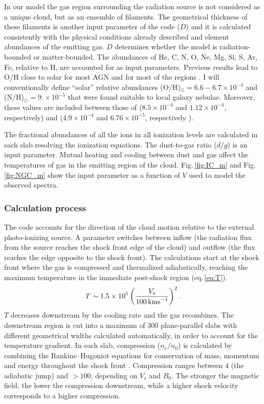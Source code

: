 \documentclass[../main.tex]{subfiles}
\begin{document}
In our model the gas region surrounding the radiation source is not considered as a unique cloud, but as an ensemble of filaments. 
The geometrical thickness of these filaments is another input parameter of the code ($D$) and it is calculated consistently with the physical conditions already described and element abundances of the emitting gas.
$D$ determines whether the model is radiation-bounded or matter-bounded.
The abundances of He, C, N, O, Ne, Mg, Si, S, Ar, Fe, relative to H, are accounted for as input parameters. 
Previous results lead to O/H close to solar for most AGN and for most of the  regions \citep[e.g.][]{Contini17}.
I will conventionally define ``solar'' relative abundances (O/H)$_{\odot }=6.6 - 6.7 \times10^{-4}$ and (N/H)$_{\odot }= 9.\times10^{-5}$ \citep{Allen76,Grevesse98} that were found suitable to local galaxy nebulae. 
Moreover, these values are included between those of \citet{Anders89} ($8.5\times10^{-4}$ and $1.12\times10^{-4}$, respectively) and \citet{Asplund09} ($4.9\times10^{-4}$ and $6.76\times10^{-5}$, respectively ).

The fractional abundances of all the ions in all ionization levels are calculated in each slab resolving the ionization equations.
The dust-to-gas ratio ($d/g$) is an input parameter. 
Mutual heating and cooling between dust and gas affect the temperatures of gas in the emitting region of the cloud.
Fig.\,\ref{fig:IC_m} and Fig.\,\ref{fig:NGC_m} show the input parameter as a function of $V$ used to model the observed spectra.

\subsubsection{Calculation process}

The code accounts for the direction of the cloud motion relative to the external photo-ionizing source.  
A parameter switches between inflow (the radiation flux from the source reaches the shock front edge of the cloud) and outflow (the flux reaches the edge opposite to the shock front).
The calculations start at the shock front where the gas is compressed and thermalized adiabatically, reaching the maximum temperature in the immediate post-shock region (eq.\,\ref{eq:T}).
\begin{equation}
\label{eq:T}
T\sim 1.5 \times 10^5 \left(\frac{V_s}{100\,\si{\kms}}\right)^2. 
\end{equation}
$T$ decreases downstream by the cooling rate and the gas recombines. 
The downstream region is cut into a maximum of 300 plane-parallel slabs with different geometrical widths calculated automatically, in order to account for the temperature gradient.
In each slab, compression ($n_e/n_0$) is calculated by combining the Rankine--Hugoniot equations for conservation of mass, momentum and energy throughout the shock front \citep{Cox72}.
Compression ranges between $4$ (the adiabatic jump) and $> 100$, depending on $V_s$ and $B_0$. 
The stronger the magnetic field, the lower the compression downstream, while a higher shock velocity corresponds to a higher compression.
\end{document}
